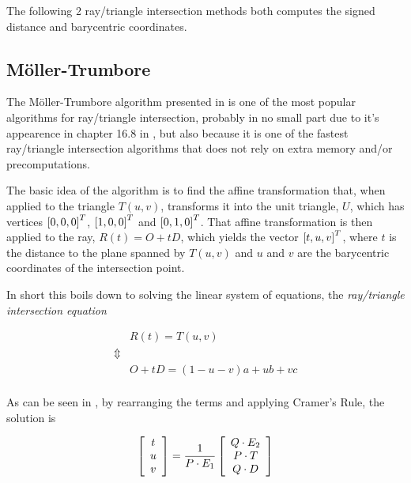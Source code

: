 The following 2 ray/triangle intersection methods both computes
the signed distance and barycentric coordinates.

\subsection{Möller-Trumbore}


The Möller-Trumbore algorithm presented in 
is one of the most popular algorithms for ray/triangle intersection,
probably in no small part due to it's appearence in chapter 16.8 in
, but also because it is one of the fastest
ray/triangle intersection algorithms that does not rely on extra
memory and/or precomputations.


The basic idea of the algorithm is to find the affine transformation
that, when applied to the triangle $T(u,v)$, transforms it into the unit
triangle, $U$, which has vertices $\left[0, 0, 0 \right]^T$,
$\left[1, 0, 0 \right]^T$ and $\left[0, 1, 0 \right]^T$. That affine
transformation is then applied to the ray, $R(t) = O + tD$, which
yields the vector $\left[t, u, v \right]^T$, where $t$ is the distance to
the plane spanned by $T(u,v)$ and $u$ and $v$ are the barycentric
coordinates of the intersection point.

In short this boils down to solving the linear system of equations,
the \textit{ray/triangle intersection equation}

\begin{displaymath}
  \begin{array}{rl}
    & R(t) = T(u,v) \\
    \Updownarrow \\
    & O + tD = (1-u-v)a + ub + vc \\
  \end{array}
\end{displaymath}

As can be seen in , by rearranging the
terms and applying Cramer's Rule, the solution is

\begin{displaymath}
  \left[\begin{array}{c} t \\ u \\ v \end{array}\right] = \frac{1}{P \cdot E_1} 
  \left[\begin{array}{c} Q \cdot E_2 \\ P \cdot T \\ Q \cdot D \end{array}\right]
\end{displaymath}

